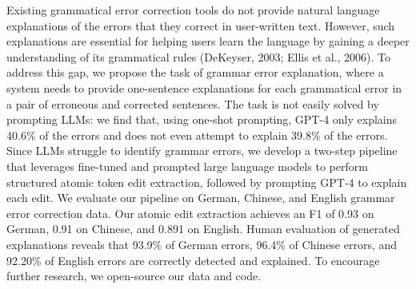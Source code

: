 Existing grammatical error correction tools do not provide natural language explanations of the errors that they correct in user-written text. However, such explanations are essential for helping users learn the language by gaining a deeper understanding of its grammatical rules (DeKeyser, 2003; Ellis et al., 2006). To address this gap, we propose the task of grammar error explanation, where a system needs to provide one-sentence explanations for each grammatical error in a pair of erroneous and corrected sentences. The task is not easily solved by prompting LLMs: we find that, using one-shot prompting, GPT-4 only explains 40.6\% of the errors and does not even attempt to explain 39.8\% of the errors. Since LLMs struggle to identify grammar errors, we develop a two-step pipeline that leverages fine-tuned and prompted large language models to perform structured atomic token edit extraction, followed by prompting GPT-4 to explain each edit. We evaluate our pipeline on German, Chinese, and English grammar error correction data. Our atomic edit extraction achieves an F1 of 0.93 on German, 0.91 on Chinese, and 0.891 on English. Human evaluation of generated explanations reveals that 93.9\% of German errors, 96.4\% of Chinese errors, and 92.20\% of English errors are correctly detected and explained. To encourage further research, we open-source our data and code.